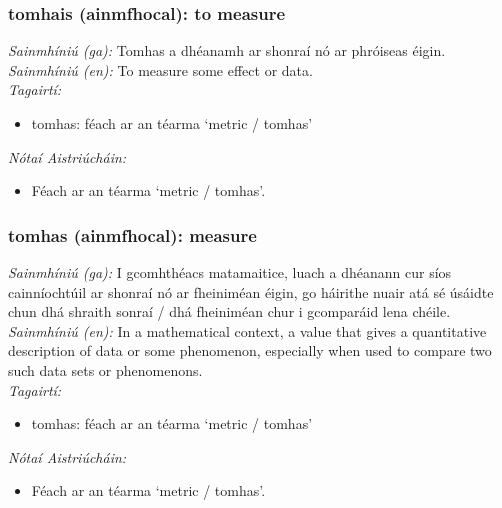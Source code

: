 \subsubsection*{tomhais (ainmfhocal): to measure}
 \noindent \textit{Sainmhíniú (ga):} Tomhas a dhéanamh ar shonraí nó ar phróiseas éigin.
\\
 \noindent \textit{Sainmhíniú (en):} To measure some effect or data.
\\
 \noindent \textit{Tagairtí:}
\begin{itemize}
	\item tomhas: féach ar an téarma `metric / tomhas'
\end{itemize}

 \noindent \textit{Nótaí Aistriúcháin:}
\begin{itemize}
	\item Féach ar an téarma `metric / tomhas'.
\end{itemize}


\subsubsection*{tomhas (ainmfhocal): measure}
 \noindent \textit{Sainmhíniú (ga):} I gcomhthéacs matamaitice, luach a dhéanann cur síos cainníochtúil ar shonraí nó ar fheiniméan éigin, go háirithe nuair atá sé úsáidte chun dhá shraith sonraí / dhá fheiniméan chur i gcomparáid lena chéile.
\\
 \noindent \textit{Sainmhíniú (en):} In a mathematical context, a value that gives a quantitative description of data or some phenomenon, especially when used to compare two such data sets or phenomenons.
\\
 \noindent \textit{Tagairtí:}
\begin{itemize}
	\item tomhas: féach ar an téarma `metric / tomhas'
\end{itemize}

 \noindent \textit{Nótaí Aistriúcháin:}
\begin{itemize}
	\item Féach ar an téarma `metric / tomhas'.
\end{itemize}


